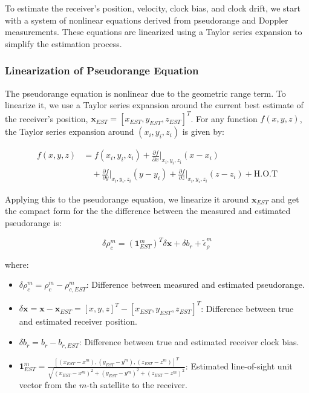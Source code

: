 \documentclass[conference]{IEEEtran}
\begin{document}
To estimate the receiver's position, velocity, clock bias, and clock drift, we start with a system of nonlinear equations derived from pseudorange and Doppler measurements. These equations are linearized using a Taylor series expansion to simplify the estimation process.

\subsubsection*{Linearization of Pseudorange Equation}

The pseudorange equation is nonlinear due to the geometric range term. To linearize it, we use a Taylor series expansion around the current best estimate of the receiver's position, \( \mathbf{x}_{EST} = [x_{EST}, y_{EST}, z_{EST}]^T \). For any function \( f(x, y, z) \), the Taylor series expansion around \( (x_i, y_i, z_i) \) is given by:

\begin{equation}
\begin{split}
f(x, y, z) &= f(x_i, y_i, z_i) + \frac{\partial f}{\partial x}\bigg|_{x_i, y_i, z_i}(x - x_i) \\
&\quad + \frac{\partial f}{\partial y}\bigg|_{x_i, y_i, z_i}(y - y_i) + \frac{\partial f}{\partial z}\bigg|_{x_i, y_i, z_i}(z - z_i) + \text{H.O.T}
\end{split}
\end{equation}

Applying this to the pseudorange equation, we linearize it around \( \mathbf{x}_{EST} \) and get the compact form for the the difference between the measured and estimated pseudorange is:

\begin{equation}
\delta \rho_c^m = \left( \mathbf{1}_{EST}^m \right)^T \delta \mathbf{x} + \delta b_r + \tilde{\epsilon}_\rho^m
\end{equation}

where:
\begin{itemize}
    \item \( \delta \rho_c^m = \rho_c^m - \rho_{c,EST}^m \): Difference between measured and estimated pseudorange.
    \item \( \delta \mathbf{x} = \mathbf{x} - \mathbf{x}_{EST} = [x, y, z]^T - [x_{EST}, y_{EST}, z_{EST}]^T \): Difference between true and estimated receiver position.
    \item \( \delta b_r = b_r - b_{r,EST} \): Difference between true and estimated receiver clock bias.
    \item \( \mathbf{1}_{EST}^m = \frac{[(x_{EST} - x^m), (y_{EST} - y^m), (z_{EST} - z^m)]^T}{\sqrt{(x_{EST} - x^m)^2 + (y_{EST} - y^m)^2 + (z_{EST} - z^m)^2}} \): Estimated line-of-sight unit vector from the \( m \)-th satellite to the receiver.
\end{itemize}
\end{document}
